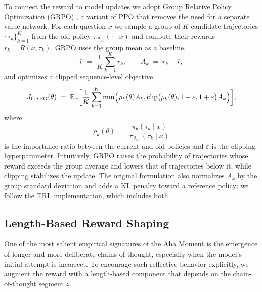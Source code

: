 \documentclass{article}
\begin{document}
To connect the reward to model updates we adopt Group Relative Policy Optimization (GRPO) \cite{shao2024deepseekmath}, a variant of PPO that removes the need for a separate value network. For each question $x$ we sample a group of $K$ candidate trajectories $\{\tau_{k}\}_{k=1}^{K}$ from the old policy $\pi_{\theta_{\text{old}}}(\cdot \mid x)$ and compute their rewards $r_{k} = R(x, \tau_{k})$. GRPO uses the group mean as a baseline,
\begin{equation}
    \bar{r} \;=\; \frac{1}{K} \sum_{k=1}^{K} r_{k},
    \qquad
    A_{k} \;=\; r_{k} - \bar{r},
\end{equation}
and optimizes a clipped sequence-level objective
\begin{equation}
    J_{\text{GRPO}}(\theta)
    \;=\;
    \mathbb{E}_{x}
    \biggl[
        \frac{1}{K} \sum_{k=1}^{K}
        \min \Bigl(
            \rho_{k}(\theta) A_{k},
            \operatorname{clip}\bigl(\rho_{k}(\theta), 1 - \varepsilon, 1 + \varepsilon\bigr) A_{k}
        \Bigr)
    \biggr],
\end{equation}
where
\begin{equation}
    \rho_{k}(\theta)
    \;=\;
    \frac{\pi_{\theta}(\tau_{k} \mid x)}{\pi_{\theta_{\text{old}}}(\tau_{k} \mid x)}
\end{equation}
is the importance ratio between the current and old policies and $\varepsilon$ is the clipping hyperparameter. Intuitively, GRPO raises the probability of trajectories whose reward exceeds the group average and lowers that of trajectories below it, while clipping stabilizes the update. The original formulation also normalizes $A_k$ by the group standard deviation and adds a KL penalty toward a reference policy; we follow the TRL implementation, which includes both.

\subsection{Length-Based Reward Shaping}
\label{sec:len}

One of the most salient empirical signatures of the Aha Moment is the emergence of longer and more deliberate chains of thought, especially when the model's initial attempt is incorrect. To encourage such reflective behavior explicitly, we augment the reward with a length-based component that depends on the chain-of-thought segment $z$.
\end{document}
